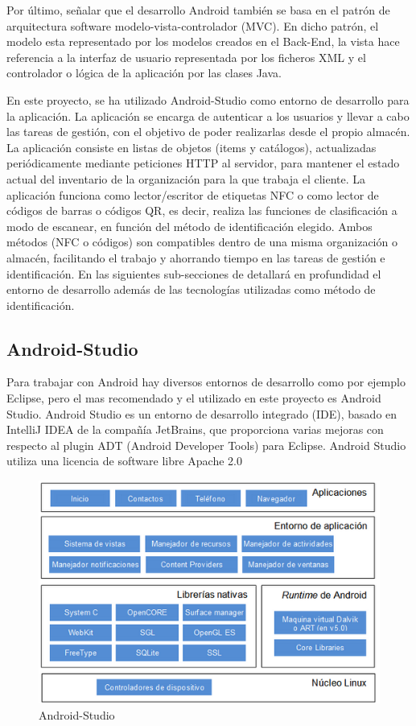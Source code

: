 \documentclass[a4paper,11pt]{book}
\begin{document}
Por último, señalar que el desarrollo Android también se basa en el patrón de arquitectura software modelo-vista-controlador (MVC). En dicho patrón, el modelo esta representado por los modelos creados en el Back-End, la vista hace referencia a la interfaz de usuario representada por los ficheros XML y el controlador o lógica de la aplicación por las clases Java. 


En este proyecto, se ha utilizado Android-Studio como entorno de desarrollo para la aplicación. La aplicación se encarga de autenticar a los usuarios y llevar a cabo las tareas de gestión, con el objetivo de poder realizarlas desde el propio almacén. La aplicación consiste en listas de  objetos (items y catálogos), actualizadas periódicamente mediante peticiones HTTP al servidor, para mantener el estado actual del inventario de la organización para la que trabaja el cliente. La aplicación funciona como lector/escritor de etiquetas NFC o como lector de códigos de barras o códigos QR, es decir, realiza las funciones de clasificación a modo de escanear, en función del método de identificación elegido. Ambos métodos (NFC o códigos) son compatibles dentro de una misma organización o almacén, facilitando el trabajo y ahorrando tiempo en las tareas de gestión e identificación. En las siguientes sub-secciones de detallará en profundidad el entorno de desarrollo además de las tecnologías utilizadas como método de identificación. 
 
  

\subsection{Android-Studio}

Para trabajar con Android hay diversos entornos de desarrollo como por ejemplo Eclipse, pero el mas recomendado y el utilizado en este proyecto es Android Studio\cite{as}. Android Studio es un entorno de desarrollo integrado (IDE), basado en IntelliJ IDEA de la compañía JetBrains,  que proporciona varias mejoras con respecto al plugin ADT (Android Developer Tools) para Eclipse. Android Studio utiliza una licencia de software libre Apache 2.0

\begin{figure}[H] 
\centering 
\includegraphics[scale=0.5]{imagenes/desarrollo_herramienta/android.png}
\caption{ Android-Studio}
\end{figure}
\end{document}
